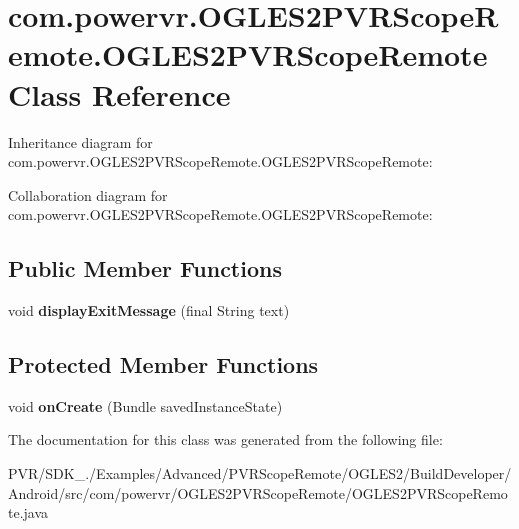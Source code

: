 \hypertarget{classcom_1_1powervr_1_1_o_g_l_e_s2_p_v_r_scope_remote_1_1_o_g_l_e_s2_p_v_r_scope_remote}{\section{com.\+powervr.\+O\+G\+L\+E\+S2\+P\+V\+R\+Scope\+Remote.\+O\+G\+L\+E\+S2\+P\+V\+R\+Scope\+Remote Class Reference}
\label{classcom_1_1powervr_1_1_o_g_l_e_s2_p_v_r_scope_remote_1_1_o_g_l_e_s2_p_v_r_scope_remote}
}


Inheritance diagram for com.\+powervr.\+O\+G\+L\+E\+S2\+P\+V\+R\+Scope\+Remote.\+O\+G\+L\+E\+S2\+P\+V\+R\+Scope\+Remote\+:


Collaboration diagram for com.\+powervr.\+O\+G\+L\+E\+S2\+P\+V\+R\+Scope\+Remote.\+O\+G\+L\+E\+S2\+P\+V\+R\+Scope\+Remote\+:
\subsection*{Public Member Functions}
\begin{DoxyCompactItemize}
\item 
\hypertarget{classcom_1_1powervr_1_1_o_g_l_e_s2_p_v_r_scope_remote_1_1_o_g_l_e_s2_p_v_r_scope_remote_a2b7a817692430fccc9bb4c13b23fd33b}{void {\bfseries display\+Exit\+Message} (final String text)}\label{classcom_1_1powervr_1_1_o_g_l_e_s2_p_v_r_scope_remote_1_1_o_g_l_e_s2_p_v_r_scope_remote_a2b7a817692430fccc9bb4c13b23fd33b}

\end{DoxyCompactItemize}
\subsection*{Protected Member Functions}
\begin{DoxyCompactItemize}
\item 
\hypertarget{classcom_1_1powervr_1_1_o_g_l_e_s2_p_v_r_scope_remote_1_1_o_g_l_e_s2_p_v_r_scope_remote_a40a77fbd33683da0115f675ff835971e}{void {\bfseries on\+Create} (Bundle saved\+Instance\+State)}\label{classcom_1_1powervr_1_1_o_g_l_e_s2_p_v_r_scope_remote_1_1_o_g_l_e_s2_p_v_r_scope_remote_a40a77fbd33683da0115f675ff835971e}

\end{DoxyCompactItemize}


The documentation for this class was generated from the following file\+:\begin{DoxyCompactItemize}
\item 
P\+V\+R/\+S\+D\+K\+\_./\+Examples/\+Advanced/\+P\+V\+R\+Scope\+Remote/\+O\+G\+L\+E\+S2/\+Build\+Developer/\+Android/src/com/powervr/\+O\+G\+L\+E\+S2\+P\+V\+R\+Scope\+Remote/O\+G\+L\+E\+S2\+P\+V\+R\+Scope\+Remote.\+java\end{DoxyCompactItemize}
